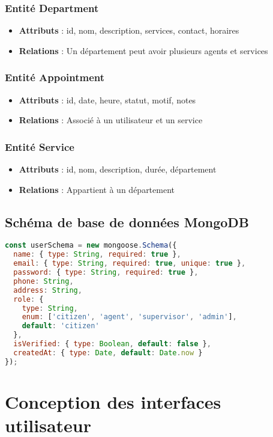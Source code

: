 \subsubsection{Entité Department}
\begin{itemize}
    \item \textbf{Attributs} : id, nom, description, services, contact, horaires
    \item \textbf{Relations} : Un département peut avoir plusieurs agents et services
\end{itemize}

\subsubsection{Entité Appointment}
\begin{itemize}
    \item \textbf{Attributs} : id, date, heure, statut, motif, notes
    \item \textbf{Relations} : Associé à un utilisateur et un service
\end{itemize}

\subsubsection{Entité Service}
\begin{itemize}
    \item \textbf{Attributs} : id, nom, description, durée, département
    \item \textbf{Relations} : Appartient à un département
\end{itemize}

\subsection{Schéma de base de données MongoDB}

\begin{lstlisting}[language=JavaScript, caption=Schéma User]
const userSchema = new mongoose.Schema({
  name: { type: String, required: true },
  email: { type: String, required: true, unique: true },
  password: { type: String, required: true },
  phone: String,
  address: String,
  role: { 
    type: String, 
    enum: ['citizen', 'agent', 'supervisor', 'admin'],
    default: 'citizen' 
  },
  isVerified: { type: Boolean, default: false },
  createdAt: { type: Date, default: Date.now }
});
\end{lstlisting}

\section{Conception des interfaces utilisateur}

